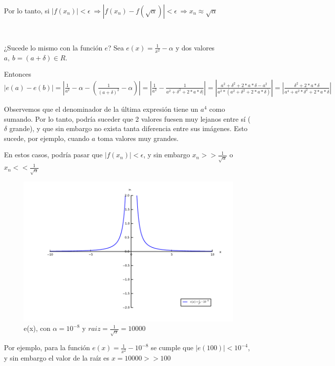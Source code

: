 Por lo tanto, si $|f(x_{n})| < \epsilon \ \Rightarrow |f(x_{n}) - f(\sqrt{\alpha})| < \epsilon \ \Rightarrow x_{n} \approx \sqrt{\alpha}$

~

¿Sucede lo mismo con la función $e$? Sea $e(x) = \frac{1}{x^{2}} - \alpha$ y dos valores $a, \ b=(a+\delta) \in R$. 

Entonces $|e(a) - e(b)| = |\frac{1}{a^{2}} - \alpha - (\frac{1}{(a+\delta)^{2}} - \alpha) | =
|\frac{1}{a^{2}} - \frac{1}{a^{2}+\delta^{2}+2*a*\delta|} | = | \frac{a^{2}+\delta^{2}+2*a*\delta-a^{2}}{a^{2}*(a^{2}+\delta^{2}+2*a*\delta)} | = |\frac{\delta^{2}+2*a*\delta}{a^{4}+a^{2}*\delta^{2}+2*a*\delta}|$

Observemos que el denominador de la última expresión tiene un $a^{4}$ como sumando. Por lo tanto, podría suceder que 2 valores fuesen muy lejanos entre sí ($\delta$ grande), y que sin embargo no exista
tanta diferencia entre sus imágenes. Esto sucede, por ejemplo, cuando $a$ toma valores muy grandes.

En estos casos, podría pasar que $|f(x_{n})| < \epsilon$, y sin embargo $x_{n} >> \frac{1}{\sqrt{\alpha}}$ o $x_{n} << \frac{1}{\sqrt{\alpha}}$

\begin{figure}[!h]
	\begin{center}
		  \includegraphics[keepaspectratio]{../Imagenes/exp3/raiz_10000.pdf}
		  \caption{e(x), con $\alpha=10^{-8}$ y $raiz=\frac{1}{\sqrt{\alpha}}=10000$ }
		  \label{fig:contra1}
	\end{center}
\end{figure}
\FloatBarrier

Por ejemplo, para la función $e(x)=\frac{1}{x^2}-10^{-8}$ se cumple que $|e(100)| < 10^{-4}$, y sin embargo el valor de la raíz es $x=10000 >> 100$














